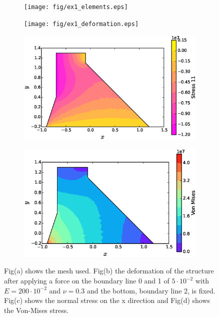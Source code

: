 \documentclass[11pt, a4paper]{article}
\numberwithin{equation}{section}
\begin{document}
\begin{figure}[H]
\centering
	\begin{subfigure}[H]{0.49\textwidth}
		\texttt{[image: fig/ex1\_elements.eps]}
		\caption{}
		\label{fig:1}
	\end{subfigure}
	\begin{subfigure}[H]{0.49\textwidth}
		\texttt{[image: fig/ex1\_deformation.eps]}
		\caption{}
		\label{fig:2}
	\end{subfigure}	
	\begin{subfigure}[H]{0.49\textwidth}
		\includegraphics[width=1.2\textwidth]{fig/ex1_stress_11.eps}
		\caption{}
		\label{fig:1}
	\end{subfigure}
	\begin{subfigure}[H]{0.49\textwidth}
		\includegraphics[width=1.2\textwidth]{fig/ex1_von_mises.eps}
		\caption{}
		\label{fig:2}
	\end{subfigure}
	\caption{Fig(a) shows the mesh used. Fig(b) the deformation of the structure after applying a force on the boundary line 0 and 1 of $5 \cdot 10^{-2}$ with $E=200 \cdot 10^{-2}$ and $\nu=0.3$ and the bottom, boundary line 2, is fixed. Fig(c) shows the normal stress on the x direction and Fig(d) shows the Von-Mises stress.}
	\label{fig:3_1}
\end{figure}
\end{document}
